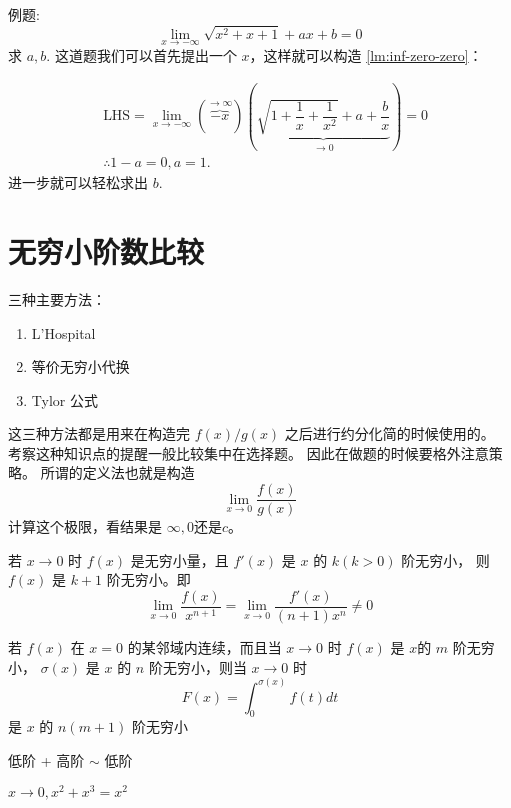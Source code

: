 例题:
\[
\lim_{x \to -\infty} \sqrt{x^2+x+1} +  ax + b = 0
\]
求 $a, b.$
这道题我们可以首先提出一个 $x$，这样就可以构造 \ref{lm:inf-zero-zero}：

\begin{align*}
	&\mbox{LHS} = \lim_{x \to -\infty} \left(\overbrace{-x}^{ \to \infty }\right)
	\left( 
	\underbrace{\sqrt{1+\dfrac{1}{x}+\dfrac{1}{x^2}} + a + \dfrac{b}{x}}_{\to 0}
	\right) = 0\\
	&\therefore 1-a = 0, a = 1.
\end{align*}
进一步就可以轻松求出 $b$.

\section{无穷小阶数比较}
三种主要方法：
\begin{enumerate}
	\item L'Hospital
	\item 等价无穷小代换
	\item Tylor 公式
\end{enumerate}

这三种方法都是用来在构造完 $f(x)/g(x)$ 之后进行约分化简的时候使用的。
考察这种知识点的提醒一般比较集中在选择题。
因此在做题的时候要格外注意策略。
所谓的定义法也就是构造
\[
    \lim_{x\to 0} \dfrac{f(x)}{g(x)}
\]
计算这个极限，看结果是 $\infty, 0$还是$c$。 

\begin{lemma}[L'Hospital求导定阶]
	若 $x \to 0$ 时 $f(x)$ 是无穷小量，且 $f'(x)$ 是 $x$ 的 $k(k>0)$ 阶无穷小，
	则 $f(x)$ 是 $k+1$ 阶无穷小。即
	\begin{equation}
		\lim_{x \to 0} \dfrac{f(x)}{x^{n+1}} = \lim_{x \to 0} \dfrac{f'(x)}{(n+1)x^{n}} \neq 0
	\end{equation}
\end{lemma}

\begin{lemma}
	若 $f(x)$ 在 $x=0$ 的某邻域内连续，而且当 $x\to0$ 时 $f(x)$ 是 $x$的 $m$ 阶无穷小，
	$\sigma(x)$ 是 $x$ 的 $n$ 阶无穷小，则当 $x\to0$ 时
	\begin{equation*}
		F(x) = \int_{0}^{\sigma(x)} f(t) dt
	\end{equation*}
	是 $x$ 的 $n(m+1)$ 阶无穷小
\end{lemma}

\begin{lemma}
	低阶 + 高阶 $\sim$ 低阶
	
	$x \to 0, x^2+x^3=x^2$
\end{lemma}

